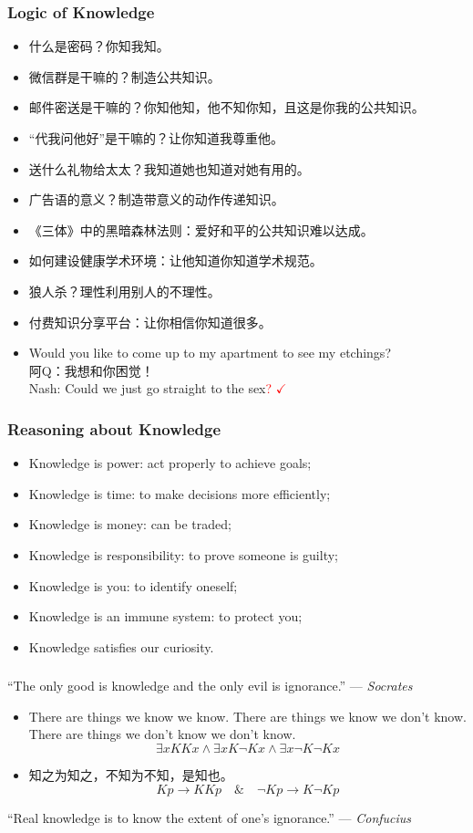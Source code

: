 \documentclass[UTF8,11pt,colorlinks,compress,openany]{beamer}%
\begin{document}
\begin{frame}\frametitle{Logic of Knowledge}
\begin{itemize}
	\item 什么是密码？你知我知。
	\item 微信群是干嘛的？制造公共知识。
	\item 邮件密送是干嘛的？你知他知，他不知你知，且这是你我的公共知识。
	\item “代我问他好”是干嘛的？让你知道我尊重他。
	\item 送什么礼物给太太？我知道她也知道对她有用的。
	\item 广告语的意义？制造带意义的动作传递知识。
	\item 《三体》中的黑暗森林法则：爱好和平的公共知识难以达成。
	\item 如何建设健康学术环境：让他知道你知道学术规范。
	\item 狼人杀？理性利用别人的不理性。
	\item 付费知识分享平台：让你相信你知道很多。
	\item Would you like to come up to my apartment to see my etchings?\\
	阿Q：我想和你困觉！\\
	Nash: Could we just go straight to the sex\textcolor{red}{? $\checkmark$\!\!\!\!}
\end{itemize}
\end{frame}

\begin{frame}\frametitle{Reasoning about Knowledge}
\begin{itemize}
	\item Knowledge is power: act properly to achieve goals;
	\item Knowledge is time: to make decisions more efficiently;
	\item Knowledge is money: can be traded;
	\item Knowledge is responsibility: to prove someone is guilty;
	\item Knowledge is you: to identify oneself;
	\item Knowledge is an immune system: to protect you;
	\item Knowledge satisfies our curiosity.
\end{itemize}
\end{frame}

\begin{frame}\frametitle{}
``The only good is knowledge and the only evil is ignorance.'' --- \textsl{Socrates}
\begin{center}
\end{center}
\begin{itemize}
\item There are things we know we know. There are things we know we don't know. There are things we don't know we don't know.
\[\exists xKKx\wedge \exists xK\neg Kx\wedge \exists x\neg K\neg Kx\]
\item 知之为知之，不知为不知，是知也。
\[Kp\to KKp\quad\&\quad\neg Kp\to K\neg Kp\]
\end{itemize}
``Real knowledge is to know the extent of one's ignorance.'' --- \textsl{Confucius}
\end{frame}
\end{document}
